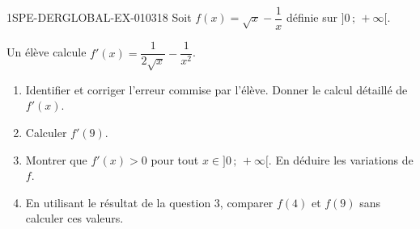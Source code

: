 \begin{exercice}{1SPE-DERGLOBAL-EX-010}{3}{18}
Soit $f(x) = \sqrt{x} - \dfrac{1}{x}$ définie sur $]0\,;\,+\infty[$.

Un élève calcule $f'(x) = \dfrac{1}{2\sqrt{x}} - \dfrac{1}{x^2}$.

\begin{enumerate}
  \item Identifier et corriger l'erreur commise par l'élève. Donner le calcul détaillé de $f'(x)$.
  \item Calculer $f'(9)$.
  \item Montrer que $f'(x) > 0$ pour tout $x \in ]0\,;\,+\infty[$. En déduire les variations de $f$.
  \item En utilisant le résultat de la question 3, comparer $f(4)$ et $f(9)$ sans calculer ces valeurs.
\end{enumerate}
\end{exercice}
